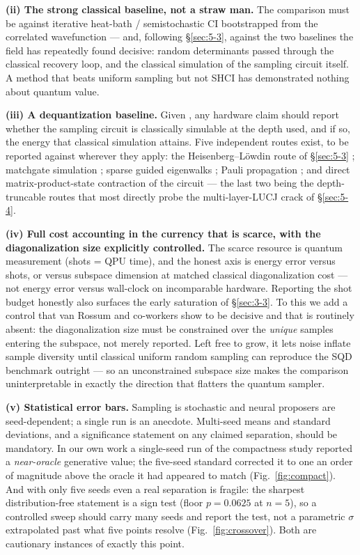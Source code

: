 \documentclass[onecolumn,a4paper]{quantumarticle}
\begin{document}
\textbf{(ii) The strong classical baseline, not a straw man.} The comparison must be against iterative heat-bath / semistochastic CI bootstrapped from the correlated wavefunction --- and, following \S\ref{sec:5-3}, against the two baselines the field has repeatedly found decisive: random determinants passed through the classical recovery loop, and the classical simulation of the sampling circuit itself. A method that beats uniform sampling but not SHCI has demonstrated nothing about quantum value.

\textbf{(iii) A dequantization baseline.} Given \cite{belagali2026}, any hardware claim should report whether the sampling circuit is classically simulable at the depth used, and if so, the energy that classical simulation attains. Five independent routes exist, to be reported against wherever they apply: the Heisenberg--L\"owdin route of \S\ref{sec:5-3} \cite{belagali2026}; matchgate simulation \cite{hassman2025}; sparse guided eigenwalks \cite{chin2026}; Pauli propagation \cite{shrikhande2025}; and direct matrix-product-state contraction of the circuit --- the last two being the depth-truncable routes that most directly probe the multi-layer-LUCJ crack of \S\ref{sec:5-4}.

\textbf{(iv) Full cost accounting in the currency that is scarce, with the diagonalization size explicitly controlled.} The scarce resource is quantum measurement (shots = QPU time), and the honest axis is energy error versus shots, or versus subspace dimension at matched classical diagonalization cost --- not energy error versus wall-clock on incomparable hardware. Reporting the shot budget honestly also surfaces the early saturation of \S\ref{sec:3-3}. To this we add a control that van Rossum and co-workers show to be decisive and that is routinely absent: the diagonalization size must be constrained over the \emph{unique} samples entering the subspace, not merely reported. Left free to grow, it lets noise inflate sample diversity until classical uniform random sampling can reproduce the SQD benchmark outright \cite{vanrossum2026} --- so an unconstrained subspace size makes the comparison uninterpretable in exactly the direction that flatters the quantum sampler.

\textbf{(v) Statistical error bars.} Sampling is stochastic and neural proposers are seed-dependent; a single run is an anecdote. Multi-seed means and standard deviations, and a significance statement on any claimed separation, should be mandatory. In our own work a single-seed run of the compactness study reported a \emph{near-oracle} generative value; the five-seed standard corrected it to one an order of magnitude above the oracle it had appeared to match (Fig.~\ref{fig:compact}). And with only five seeds even a real separation is fragile: the sharpest distribution-free statement is a sign test (floor $p{=}0.0625$ at $n{=}5$), so a controlled sweep should carry many seeds and report the test, not a parametric $\sigma$ extrapolated past what five points resolve (Fig.~\ref{fig:crossover}). Both are cautionary instances of exactly this point.
\end{document}
